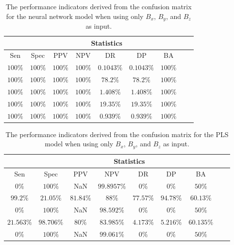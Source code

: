 \begin{table}[!ht]
	\centering
	\begin{tabular}{|c|c|c|c|c|c|c|c|c|}
		\hline
		 & \multicolumn{7}{c|}{Statistics} \\ \hline
		Sen & Spec & PPV & NPV & DR & DP & BA \\ \hline
		$100\%$ & $100\%$ & $100\%$ & $100\%$ & $0.1043\%$ & $0.1043\%$ & $100\%$ \\ \hline
		$100\%$ & $100\%$ & $100\%$ & $100\%$ & $78.2\%$ & $78.2\%$ & $100\%$ \\ \hline
		$100\%$ & $100\%$ & $100\%$ & $100\%$ & $1.408\%$ & $1.408\%$ & $100\%$ \\ \hline
		$100\%$ & $100\%$ & $100\%$ & $100\%$ & $19.35\%$ & $19.35\%$ & $100\%$ \\ \hline
		$100\%$ & $100\%$ & $100\%$ & $100\%$ & $0.939\%$ & $0.939\%$ & $100\%$ \\ \hline
	\end{tabular}
	\caption{The performance indicators derived from the confusion matrix for the neural network model when using only $B_{x}$, $B_{y}$, and $B_{z}$ as input.}
	\label{tab:cs:coord:nnet}
\end{table}

\begin{table}[!ht]
	\centering
	\begin{tabular}{|c|c|c|c|c|c|c|c|c|}
		\hline
		 & \multicolumn{7}{c|}{Statistics} \\ \hline
		Sen & Spec & PPV & NPV & DR & DP & BA \\ \hline
		$0\%$ & $100\%$ & NaN & $99.8957\%$ & $0\%$ & $0\%$ & $50\%$ \\ \hline
		$99.2\%$ & $21.05\%$ & $81.84\%$ & $88\%$ & $77.57\%$ & $94.78\%$ & $60.13\%$ \\ \hline
		$0\%$ & $100\%$ & NaN & $98.592\%$ & $0\%$ & $0\%$ & $50\%$ \\ \hline
		$21.563\%$ & $98.706\%$ & $80\%$ & $83.985\%$ & $4.173\%$ & $5.216\%$ & $60.135\%$ \\ \hline
		$0\%$ & $100\%$ & NaN & $99.061\%$ & $0\%$ & $0\%$ & $50\%$ \\ \hline
	\end{tabular}
	\caption{The performance indicators derived from the confusion matrix for the PLS model when using only $B_{x}$, $B_{y}$, and $B_{z}$ as input.}
	\label{tab:cs:coord:pls}
\end{table}

